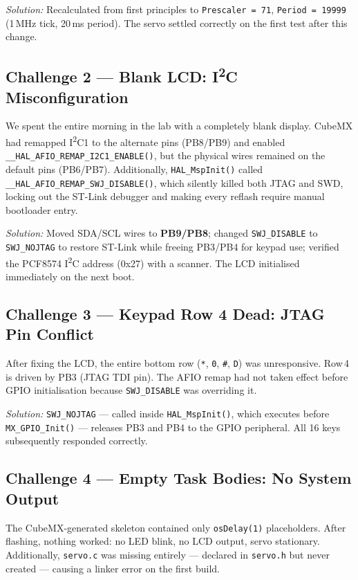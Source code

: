 \documentclass[11pt, a4paper]{article}
\begin{document}
\textit{Solution:} Recalculated from first principles to \texttt{Prescaler = 71},
\texttt{Period = 19999} (1\,MHz tick, 20\,ms period). The servo settled correctly on the
first test after this change.

\subsection{Challenge 2 — Blank LCD: I\textsuperscript{2}C Misconfiguration}

We spent the entire morning in the lab with a completely blank display.
CubeMX had remapped I\textsuperscript{2}C1 to the alternate pins (PB8/PB9)
and enabled \texttt{\_\_HAL\_AFIO\_REMAP\_I2C1\_ENABLE()}, but the physical wires
remained on the default pins (PB6/PB7). Additionally, \texttt{HAL\_MspInit()} called
\texttt{\_\_HAL\_AFIO\_REMAP\_SWJ\_DISABLE()}, which silently killed both JTAG and SWD,
locking out the ST-Link debugger and making every reflash require manual bootloader entry.

\textit{Solution:} Moved SDA/SCL wires to \textbf{PB9/PB8}; changed
\texttt{SWJ\_DISABLE} to \texttt{SWJ\_NOJTAG} to restore ST-Link while freeing PB3/PB4
for keypad use; verified the PCF8574 I\textsuperscript{2}C address (0x27) with a scanner.
The LCD initialised immediately on the next boot.

\subsection{Challenge 3 — Keypad Row 4 Dead: JTAG Pin Conflict}

After fixing the LCD, the entire bottom row (\texttt{*}, \texttt{0}, \texttt{\#}, \texttt{D})
was unresponsive. Row\,4 is driven by PB3 (JTAG TDI pin). The AFIO remap had not taken
effect before GPIO initialisation because \texttt{SWJ\_DISABLE} was overriding it.

\textit{Solution:} \texttt{SWJ\_NOJTAG} — called inside \texttt{HAL\_MspInit()},
which executes before \texttt{MX\_GPIO\_Init()} — releases PB3 and PB4 to the GPIO
peripheral. All 16 keys subsequently responded correctly.

\subsection{Challenge 4 — Empty Task Bodies: No System Output}

The CubeMX-generated skeleton contained only \texttt{osDelay(1)} placeholders.
After flashing, nothing worked: no LED blink, no LCD output, servo stationary.
Additionally, \texttt{servo.c} was missing entirely — declared in \texttt{servo.h}
but never created — causing a linker error on the first build.
\end{document}
